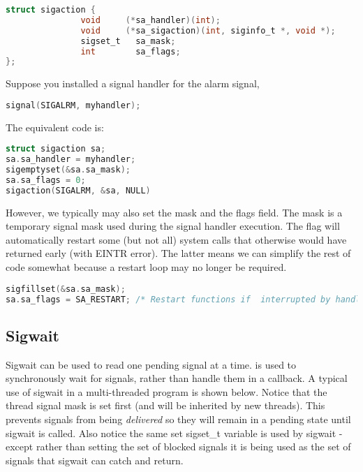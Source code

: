 \begin{lstlisting}[language=C]
struct sigaction {
               void     (*sa_handler)(int);
               void     (*sa_sigaction)(int, siginfo_t *, void *);
               sigset_t   sa_mask;
               int        sa_flags;
}; 
\end{lstlisting}

Suppose you installed a signal handler for the alarm signal,

\begin{lstlisting}[language=C]
signal(SIGALRM, myhandler);
\end{lstlisting}

The equivalent  code is:

\begin{lstlisting}[language=C]
struct sigaction sa; 
sa.sa_handler = myhandler;
sigemptyset(&sa.sa_mask);
sa.sa_flags = 0; 
sigaction(SIGALRM, &sa, NULL)
\end{lstlisting}

However, we typically may also set the mask and the flags field. The mask is a temporary signal mask used during the signal handler execution. The  flag will automatically restart some (but not all) system calls that otherwise would have returned early (with EINTR error). The latter means we can simplify the rest of code somewhat because a restart loop may no longer be required.

\begin{lstlisting}[language=C]
sigfillset(&sa.sa_mask);
sa.sa_flags = SA_RESTART; /* Restart functions if  interrupted by handler */     
\end{lstlisting}

\subsection{Sigwait}

Sigwait can be used to read one pending signal at a time.  is used to synchronously wait for signals, rather than handle them in a callback. A typical use of sigwait in a multi-threaded program is shown below. Notice that the thread signal mask is set first (and will be inherited by new threads). This prevents signals from being \emph{delivered} so they will remain in a pending state until sigwait is called. Also notice the same set sigset\_t variable is used by sigwait - except rather than setting the set of blocked signals it is being used as the set of signals that sigwait can catch and return.

